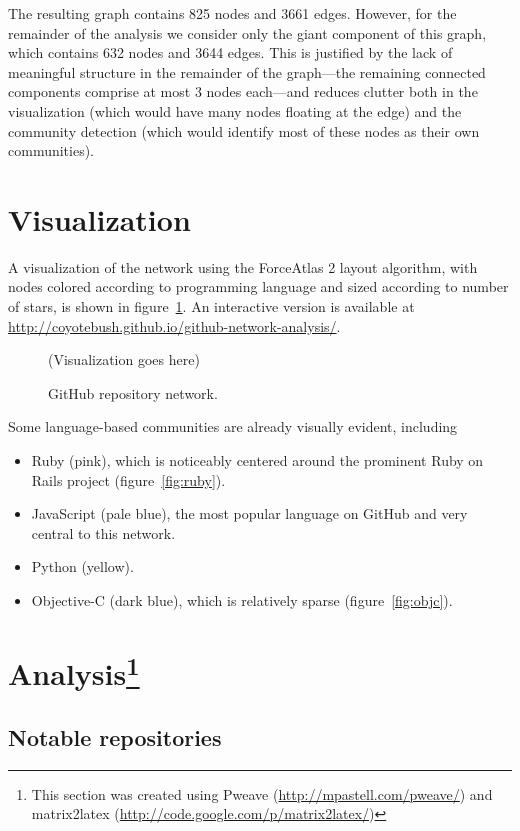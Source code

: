 \documentclass[11pt]{article}
\begin{document}
The resulting graph contains 825 nodes and 3661 edges. However, for the
remainder of the analysis we consider only the giant component of this graph,
which contains 632 nodes and 3644 edges. This is justified by the lack of
meaningful structure in the remainder of the graph---the remaining connected
components comprise at most 3 nodes each---and reduces clutter both in the
visualization (which would have many nodes floating at the edge) and the
community detection (which would identify most of these nodes as their own
communities).

\section{Visualization}
A visualization of the network using the ForceAtlas 2 layout algorithm, with
nodes colored according to programming language and sized according to number of
stars, is shown in figure~\ref{fig:fullnetwork}. An interactive version is
available at \url{http://coyotebush.github.io/github-network-analysis/}.

\begin{figure}[htbp]
    \centering
    (Visualization goes here)
    \caption{GitHub repository network.}
    \label{fig:fullnetwork}
\end{figure}

Some language-based communities are already visually evident, including
\begin{itemize}
    \item Ruby (pink), which is noticeably centered around the prominent Ruby on
        Rails project (figure~\ref{fig:ruby}).
    \item JavaScript (pale blue), the most popular language on GitHub and very
        central to this network.
    \item Python (yellow).
    \item Objective-C (dark blue), which is relatively sparse
        (figure~\ref{fig:objc}).
\end{itemize}

\section[Analysis]{Analysis\footnote{This section was created using Pweave
(\url{http://mpastell.com/pweave/}) and
matrix2latex (\url{http://code.google.com/p/matrix2latex/})}}

\subsection{Notable repositories}
\end{document}
